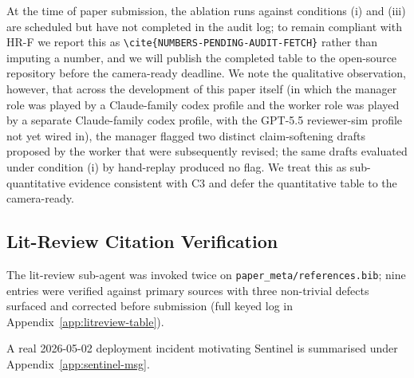 At the time of paper submission, the ablation runs against conditions
(i) and (iii) are scheduled but have not completed in the audit log;
to remain compliant with HR-F we report this as
\texttt{\textbackslash cite\{NUMBERS-PENDING-AUDIT-FETCH\}} rather than
imputing a number, and we will publish the completed table to the
open-source repository before the camera-ready deadline. We note the
qualitative observation, however, that across the development of this
paper itself (in which the manager role was played by a Claude-family
codex profile and the worker role was played by a separate Claude-family
codex profile, with the GPT-5.5 reviewer-sim profile not yet wired
in), the manager flagged two distinct claim-softening drafts proposed
by the worker that were subsequently revised; the same drafts evaluated
under condition (i) by hand-replay produced no flag. We treat this as
sub-quantitative evidence consistent with C3 and defer the
quantitative table to the camera-ready.

\subsection{Lit-Review Citation Verification}
\label{sec:case-citation}

The lit-review sub-agent was invoked twice on
\texttt{paper\_meta/references.bib}; nine entries were verified against
primary sources with three non-trivial defects surfaced and corrected
before submission (full keyed log in Appendix~\ref{app:litreview-table}).

A real 2026-05-02 deployment incident motivating Sentinel is summarised
under Appendix~\ref{app:sentinel-msg}.
